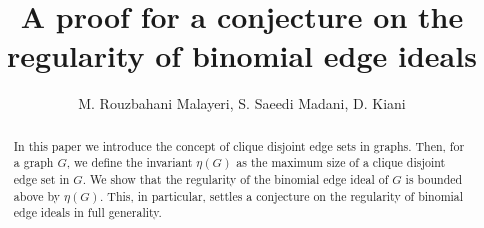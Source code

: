 \documentclass[12pt]{amsart}
\begin{document}
	\title{A proof for a conjecture on the regularity of binomial edge ideals}
	\author {M. Rouzbahani Malayeri, S. Saeedi Madani, D. Kiani}
		
	\address{Mohammad Rouzbahani Malayeri, Department of Mathematics and Computer Science, Amirkabir University of Technology (Tehran Polytechnic), Tehran, Iran}
	
		\address{Sara Saeedi Madani, Department of Mathematics and Computer Science, Amirkabir University of Technology (Tehran Polytechnic), Tehran, Iran, and School of Mathematics, Institute for Research in Fundamental Sciences (IPM), Tehran, Iran}
	
		\address{Dariush Kiani, Department of Mathematics and Computer Science, Amirkabir University of Technology (Tehran Polytechnic), Tehran, Iran, and School of Mathematics, Institute for Research in Fundamental Sciences (IPM), Tehran, Iran}
	

	


	
	
	\begin{abstract}
	In this paper we introduce the concept of clique disjoint edge sets in graphs. Then, for a graph $G$, we define the invariant $\eta(G)$ as the maximum size of a clique disjoint edge set in $G$. We show that the regularity of the binomial edge ideal of $G$ is bounded above by $\eta(G)$. This, in particular, settles a conjecture on the regularity of binomial edge ideals in full generality.  
	
	\end{abstract}
	
	
	
	
	\maketitle
	
\end{document}
